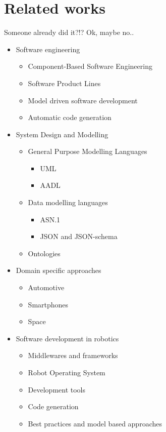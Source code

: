 \chapter[Related works]{Related works}\label{ch:Related}

Someone already did it?!? Ok, maybe no..

\begin{itemize}
\item Software engineering
	\begin{itemize}
	\item Component-Based Software Engineering
	\item Software Product Lines
	\item Model driven software development
	\item Automatic code generation
	\end{itemize}
\item System Design and Modelling
	\begin{itemize}
	\item General Purpose Modelling Languages
		\begin{itemize}
		\item UML
		\item AADL
		\end{itemize}
	\item Data modelling languages
		\begin{itemize}
		\item ASN.1
		\item JSON and JSON-schema
		\end{itemize}
        	\item Ontologies
	\end{itemize}
\item Domain specific approaches
	\begin{itemize}
	\item Automotive
	\item Smartphones
	\item Space
	\end{itemize}
\item Software development in robotics
	\begin{itemize}
	\item Middlewares and frameworks
	\item Robot Operating System
	\item Development tools
	\item Code generation
	\item Best practices and model based approaches
	\end{itemize}
\end{itemize}

